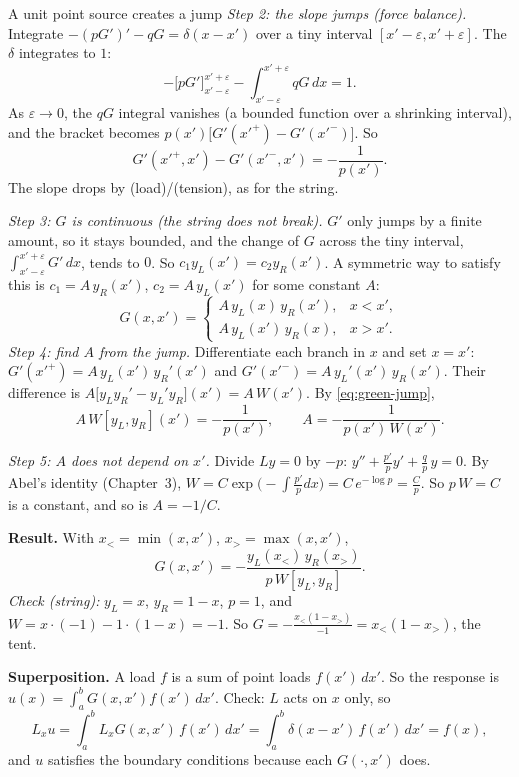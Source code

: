 \documentclass[11pt]{beamer}
\begin{document}
\begin{frame}[allowframebreaks=1.00]{A unit point source creates a jump}
\emph{Step 2: the slope jumps (force balance).} Integrate \(-(pG')'-qG=\delta(x-x')\) over a tiny interval
\([x'-\varepsilon,x'+\varepsilon]\). The \(\delta\) integrates to \(1\):
\[
 -\bigl[pG'\bigr]_{x'-\varepsilon}^{x'+\varepsilon}
 -\int_{x'-\varepsilon}^{x'+\varepsilon}qG\,dx=1 .
\]
As \(\varepsilon\to0\), the \(qG\) integral vanishes (a bounded function over a shrinking interval), and the
bracket becomes \(p(x')\bigl[G'(x'^+)-G'(x'^-)\bigr]\). So
\begin{equation}
 G'(x'^+,x')-G'(x'^-,x')=-\frac1{p(x')} .
 \label{eq:green-jump}
\end{equation}
The slope drops by (load)/(tension), as for the string.


\emph{Step 3: \(G\) is continuous (the string does not break).} \(G'\) only jumps by a finite amount, so it
stays bounded, and the change of \(G\) across the tiny interval,
\(\int_{x'-\varepsilon}^{x'+\varepsilon}G'\,dx\), tends to \(0\). So \(c_1y_L(x')=c_2y_R(x')\). A symmetric way to satisfy this is
\(c_1=A\,y_R(x')\), \(c_2=A\,y_L(x')\) for some constant \(A\):
\[
 G(x,x')=
 \begin{cases}
  A\,y_L(x)\,y_R(x'), & x<x',\\[2pt]
  A\,y_L(x')\,y_R(x), & x>x'.
 \end{cases}
\]
\emph{Step 4: find \(A\) from the jump.} Differentiate each branch in \(x\) and set \(x=x'\):
\(G'(x'^+)=A\,y_L(x')\,y_R'(x')\) and \(G'(x'^-)=A\,y_L'(x')\,y_R(x')\). Their difference is
\(A\bigl[y_Ly_R'-y_L'y_R\bigr](x')=A\,W(x')\). By \eqref{eq:green-jump},
\[
 A\,W[y_L,y_R](x')=-\frac1{p(x')},\qquad A=-\frac{1}{p(x')\,W(x')}.
\]


\emph{Step 5: \(A\) does not depend on \(x'\).} Divide \(Ly=0\) by \(-p\): \(y''+\frac{p'}{p}y'+\frac qp\,y=0\). By Abel's
identity (Chapter~3), \(W=C\exp\bigl(-\int\frac{p'}{p}dx\bigr)=C\,e^{-\log p}=\frac{C}{p}\). So \(p\,W=C\) is a
constant, and so is \(A=-1/C\).

\textbf{Result.} With \(x_<=\min(x,x')\), \(x_>=\max(x,x')\),
\begin{equation}
 G(x,x')=-\frac{y_L(x_<)\,y_R(x_>)}{p\,W[y_L,y_R]}.
 \label{eq:green-two-sol}
\end{equation}
\emph{Check (string):} \(y_L=x\), \(y_R=1-x\), \(p=1\), and \(W=x\cdot(-1)-1\cdot(1-x)=-1\). So
\(G=-\frac{x_<(1-x_>)}{-1}=x_<(1-x_>)\), the tent.

\textbf{Superposition.} A load \(f\) is a sum of point loads \(f(x')\,dx'\). So the response is
\(u(x)=\int_a^bG(x,x')f(x')\,dx'\). Check: \(L\) acts on \(x\) only, so
\[
 L_xu=\int_a^b L_xG(x,x')\,f(x')\,dx'=\int_a^b\delta(x-x')\,f(x')\,dx'=f(x),
\]
and \(u\) satisfies the boundary conditions because each \(G(\cdot,x')\) does.
\end{frame}
\end{document}
